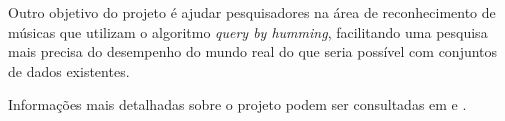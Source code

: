 Outro objetivo do projeto é ajudar pesquisadores na área de reconhecimento de músicas que utilizam o algoritmo \textit{query by humming}, facilitando uma pesquisa mais precisa do desempenho do mundo real do que seria possível com conjuntos de dados existentes.

Informações mais detalhadas sobre o projeto podem ser consultadas em \cite{pardo2010, pardo2012} e \cite{huq2010}.
